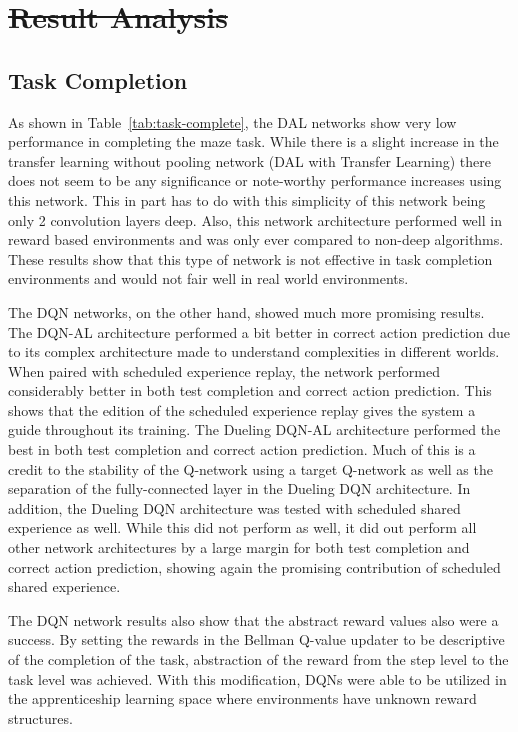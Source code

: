\documentclass[12pt,american]{report}
\providecommand{\DIFaddtex}[1]{{\protect\color{blue}\uwave{#1}}} %
\providecommand{\DIFdeltex}[1]{{\protect\color{red}\sout{#1}}}                      %
\providecommand{\DIFaddbegin}{} %
\providecommand{\DIFaddend}{} %
\providecommand{\DIFdelbegin}{} %
\providecommand{\DIFdelend}{} %
\providecommand{\DIFadd}[1]{\texorpdfstring{\DIFaddtex{#1}}{#1}} %
\providecommand{\DIFdel}[1]{\texorpdfstring{\DIFdeltex{#1}}{}} %
\newcommand{\DIFscaledelfig}{0.5}
\newlength{\DIFdelgraphicswidth} %
\newlength{\DIFdelgraphicsheight} %
\newcommand{\DIFaddincludegraphics}[2][]{{\color{blue}\fbox{\DIFOincludegraphics[#1]{#2}}}} %
\newcommand{\DIFdelincludegraphics}[2][]{%
\sbox{\DIFdelgraphicsbox}{\DIFOincludegraphics[#1]{#2}}%
\settoboxwidth{\DIFdelgraphicswidth}{\DIFdelgraphicsbox} %
\settoboxtotalheight{\DIFdelgraphicsheight}{\DIFdelgraphicsbox} %
\scalebox{\DIFscaledelfig}{%
\parbox[b]{\DIFdelgraphicswidth}{\usebox{\DIFdelgraphicsbox}\\[-\baselineskip] \rule{\DIFdelgraphicswidth}{0em}}\llap{\resizebox{\DIFdelgraphicswidth}{\DIFdelgraphicsheight}{%
\setlength{\unitlength}{\DIFdelgraphicswidth}%
\begin{picture}(1,1)%
\thicklines\linethickness{2pt} %
{\color[rgb]{1,0,0}\put(0,0){\framebox(1,1){}}}%
{\color[rgb]{1,0,0}\put(0,0){\line( 1,1){1}}}%
{\color[rgb]{1,0,0}\put(0,1){\line(1,-1){1}}}%
\end{picture}%
}\hspace*{3pt}}} %
} %
\DeclareRobustCommand{\DIFaddbegin}{\DIFOaddbegin \let\includegraphics\DIFaddincludegraphics} %
\DeclareRobustCommand{\DIFaddend}{\DIFOaddend \let\includegraphics\DIFOincludegraphics} %
\DeclareRobustCommand{\DIFdelbegin}{\DIFOdelbegin \let\includegraphics\DIFdelincludegraphics} %
\DeclareRobustCommand{\DIFdelend}{\DIFOaddend \let\includegraphics\DIFOincludegraphics} %
\begin{document}
\section{\DIFdelbegin \DIFdel{Result Analysis}\DIFdelend \DIFaddbegin \DIFadd{Discussion}\DIFaddend }

\subsection{Task Completion}
As shown in Table~\ref{tab:task-complete}, the DAL networks show very low performance in completing the maze task.  While there is a slight increase in the transfer learning without pooling network (DAL with Transfer Learning) there does not seem to be any significance or note-worthy performance increases using this network.  This in part has to do with this simplicity of this network being only 2 convolution layers deep.  Also, this network architecture performed well in reward based environments and was only ever compared to non-deep algorithms.  These results show that this type of network is not effective in task completion environments and would not fair well in real world environments.  

The DQN networks, on the other hand, showed much more promising results. The DQN-AL architecture performed a bit better in correct action prediction due to its complex architecture made to understand complexities in different worlds. When paired with scheduled experience replay, the network performed considerably better in both test completion and correct action prediction.  This shows that the edition of the scheduled experience replay gives the system a guide throughout its training.  The Dueling DQN-AL architecture performed the best in both test completion and correct action prediction.  Much of this is a credit to the stability of the Q-network using a target Q-network as well as the separation of the fully-connected layer in the Dueling DQN architecture.  In addition, the Dueling DQN architecture was tested with scheduled shared experience as well.  While this did not perform as well, it did out perform all other network architectures by a large margin for both test completion and correct action prediction, showing again the promising contribution of scheduled shared experience. 

The DQN network results also show that the abstract reward values also were a success. By setting the rewards in the Bellman Q-value updater to be descriptive of the completion of the task, abstraction of the reward from the step level to the task level was achieved.  With this modification, DQNs were able to be utilized in the apprenticeship learning space where environments have unknown reward structures. 
\end{document}
